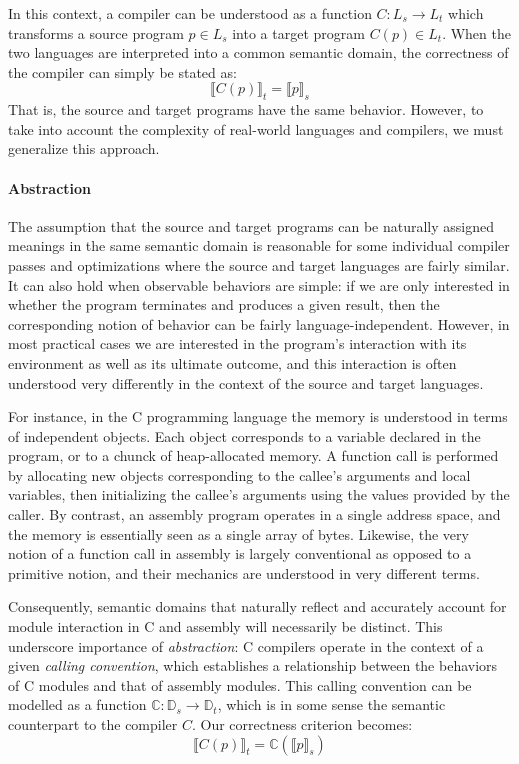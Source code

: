 \documentclass[sigplan,10pt,review,anonymous]{acmart}
\begin{document}
In this context,
a compiler can be understood as a function
$C : L_s \rightarrow L_t$
which transforms a source program $p \in L_s$
into a target program $C(p) \in L_t$.
When the two languages are interpreted into
a common semantic domain,
the correctness of the compiler can simply be stated as:
\[ \llbracket C(p) \rrbracket_t =
    \llbracket p \rrbracket_s \]
That is,
the source and target programs have the same behavior.
However,
to take into account the complexity of real-world languages and compilers,
we must generalize this approach.

\paragraph{Abstraction}

The assumption that the source and target programs
can be naturally assigned meanings in the same semantic domain
is reasonable for some individual compiler passes and optimizations
where the source and target languages are fairly similar.
It can also hold when observable behaviors are simple:
if we are only interested in whether the program terminates
and produces a given result,
then the corresponding notion of behavior
can be fairly language-independent.
However,
in most practical cases we are interested in
the program's interaction with its environment
as well as its ultimate outcome,
and this interaction is often understood very differently
in the context of the source and target languages.

For instance,
in the C programming language
the memory is understood in terms of independent objects.
Each object corresponds to a variable declared in the program,
or to a chunck of heap-allocated memory.
A function call is performed by allocating new objects
corresponding to the callee's arguments and local variables,
then initializing the callee's arguments
using the values provided by the caller.
By contrast,
an assembly program
operates in a single address space,
and the memory is essentially seen as a single array of bytes.
Likewise,
the very notion of a function call in assembly
is largely conventional as opposed to a primitive notion,
and their mechanics are understood in very different terms.

Consequently,
semantic domains that naturally reflect and accurately account
for module interaction in C and assembly will necessarily be distinct.
This underscore importance of \emph{abstraction}:
C compilers operate in the context of a given \emph{calling convention},
which establishes a relationship between the behaviors of C modules
and that of assembly modules.
This calling convention can be modelled as a function
$\mathbb{C} : \mathbb{D}_s \rightarrow \mathbb{D}_t$,
which is in some sense the semantic counterpart to the compiler $C$.
Our correctness criterion becomes:
\[ \llbracket C(p) \rrbracket_t =
    \mathbb{C}(\llbracket p \rrbracket_s) \]
\end{document}
